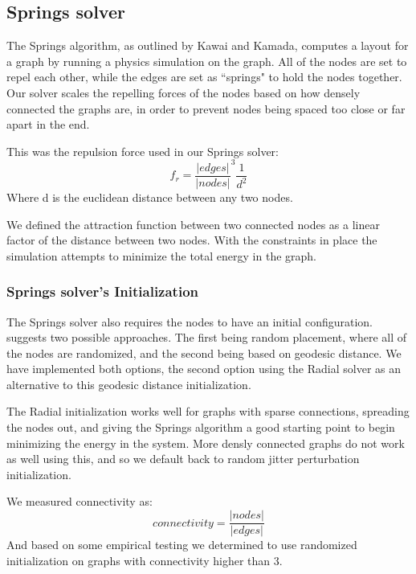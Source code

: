 \documentclass{article}
\begin{document}
\subsection{Springs solver}

The Springs algorithm, as outlined by Kawai and Kamada\cite{springs}, computes a layout for a graph by running a physics simulation on the graph. All of the nodes are set to repel each other, while the edges are set as ``springs" to hold the nodes together. Our solver scales the repelling forces of the nodes based on how densely connected the graphs are, in order to prevent nodes being spaced too close or far apart in the end.

This was the repulsion force used in our Springs solver:
$$ f_r = \frac{|edges|}{|nodes|}^3 \frac{1}{d^2} $$
Where d is the euclidean distance between any two nodes. 

We defined the attraction function between two connected nodes as a linear factor of the distance between two nodes. With the constraints in place the simulation attempts to minimize the total energy in the graph.

\subsubsection{Springs solver's Initialization}
The Springs solver also requires the nodes to have an initial configuration. 
suggests two possible approaches. The first being random placement, where all of the nodes are randomized, and the second being based on geodesic distance. We have implemented both options, the second option using the Radial solver as an alternative to this geodesic distance initialization. 

The Radial initialization works well for graphs with sparse connections, spreading the nodes out, and giving the Springs algorithm a good starting point to begin minimizing the energy in the system. More densly connected graphs do not work as well using this, and so we default back to random jitter perturbation initialization.

We measured connectivity as:
$$connectivity = \frac{|nodes|}{|edges|}$$
And based on some empirical testing we determined to use randomized initialization on graphs with connectivity higher than 3.
\end{document}
